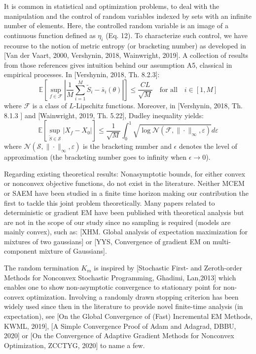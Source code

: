 \documentclass[anon,12pt]{alt2021} %
\begin{document}
It is common in statistical and optimization problems, to deal with the manipulation and the control of random variables indexed by sets with an infinite number of elements. 
Here, the controlled random variable is an image of a continuous function defined as $\eta_i$ (Eq. 12).
To characterize such control, we have recourse to the notion of metric entropy (or bracketing number) as developed in [Van der Vaart, 2000, Vershynin, 2018, Wainwright, 2019].
A collection of results from those references gives intuition behind our assumption A5, classical in empirical processes.
In [Vershynin, 2018, Th. 8.2.3]:
$$\mathbb{E} \left[\underset{f \in \mathcal{F}}{ \sup } \left|\frac{1}{M} \sum_{i=1}^{M} \tilde{S}_i- \bar{s}_i(\theta)\right| \right] \leq \frac{C L}{\sqrt{M}} \quad \textrm{for all} \quad  i \in [1, M]$$
where $\mathcal{F}$ is a class of $L$-Lipschitz functions.
Moreover, in [Vershynin, 2018, Th. 8.1.3 ] and [Wainwright, 2019, Th. 5.22], Dudley inequality yields:
$$\mathbb{E} [ \underset{\tilde{S} \in \mathcal{S}}{\sup} |X_{f}-X_{0} | ] \leq \frac{1}{\sqrt{M}} \int_{0}^{1} \sqrt{\log \mathcal{N}\left(\mathcal{F},\|\cdot\|_{\infty}, \varepsilon\right)} d \varepsilon $$
where $\mathcal{N}\left(\mathcal{S},\|\cdot\|_{\infty}, \varepsilon\right)$ is the bracketing number and $\epsilon$ denotes the level of approximation (the bracketing number goes to infinity when $\epsilon  \to 0$). 

Regarding existing theoretical results: Nonasymptotic bounds, for either convex or nonconvex objective functions, do not exist in the literature. 
Neither MCEM or SAEM have been studied in a finite time horizon making our contribution the first to tackle this joint problem theoretically.
Many papers related to deterministic or gradient EM have been published with theoretical analysis but are not in the scope of our study since no sampling is required (models are mainly convex), such as: [XHM. Global analysis of expectation maximization for mixtures of two gaussians] or [YYS, Convergence of gradient EM on multi-component mixture of Gaussians].

The random termination $K_m$ is inspired by [Stochastic First- and Zeroth-order Methods for Nonconvex Stochastic Programming, Ghadimi, Lan,2013] which enables one to show non-asymptotic convergence to stationary point for non-convex optimization. 
Involving a randomly drawn stopping criterion has been widely used since then in the literature to provide novel finite-time analysis (in expectation), see [On the Global Convergence of (Fast) Incremental EM Methods, KWML, 2019], [A Simple Convergence Proof of Adam and Adagrad, DBBU, 2020] or [On the Convergence of Adaptive Gradient Methods for Nonconvex Optimization, ZCCTYG, 2020] to name a few.
\end{document}
